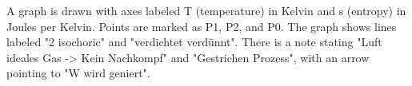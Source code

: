 A graph is drawn with axes labeled T (temperature) in Kelvin and s (entropy) in Joules per Kelvin. Points are marked as P1, P2, and P0. The graph shows lines labeled "2 isochoric" and "verdichtet verdünnt". There is a note stating "Luft ideales Gas -> Kein Nachkompf" and "Gestrichen Prozess", with an arrow pointing to "W wird geniert".